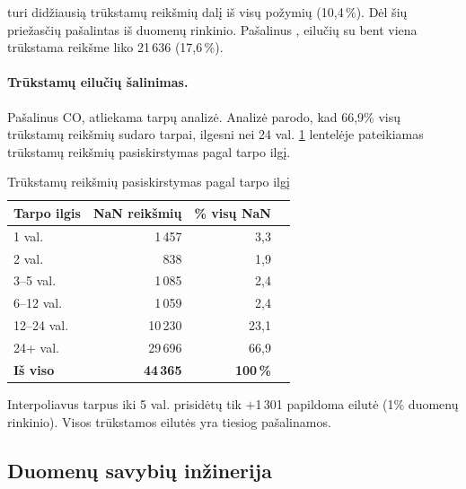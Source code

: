 \documentclass[]{VUMIFTemplateClass}
\begin{document}
     turi didžiausią trūkstamų reikšmių dalį iš visų požymių (10,4\,\%). Dėl šių priežasčių  pašalintas iš duomenų rinkinio.
    Pašalinus , eilučių su bent viena trūkstama reikšme liko 21\,636 (17,6\,\%).

    \paragraph{Trūkstamų eilučių šalinimas.}
    Pašalinus CO, atliekama tarpų analizė.
    Analizė parodo, kad 66,9\% visų trūkstamų reikšmių sudaro tarpai, ilgesni nei 24 val. \ref{tab:gap_distribution} lentelėje pateikiamas trūkstamų reikšmių pasiskirstymas pagal tarpo ilgį.

    \begin{table}[H]
        \centering
        \caption{Trūkstamų reikšmių pasiskirstymas pagal tarpo ilgį}
        \small
        \setlength{\tabcolsep}{5pt}
        \begin{tabular}{|l|r|r|r|}
            \hline
            \textbf{Tarpo ilgis} & \textbf{NaN reikšmių} & \textbf{\% visų NaN} \\
            \hline
            1 val.               & 1\,457                & 3,3                  \\
            2 val.               & 838                   & 1,9                  \\
            3--5 val.            & 1\,085                & 2,4                  \\
            6--12 val.           & 1\,059                & 2,4                  \\
            12--24 val.          & 10\,230               & 23,1                 \\
            24+ val.             & 29\,696               & 66,9                 \\
            \hline
            \textbf{Iš viso}     & \textbf{44\,365}      & \textbf{100\,\%}     \\
            \hline
        \end{tabular}
        \label{tab:gap_distribution}
    \end{table}

    Interpoliavus tarpus iki 5 val. prisidėtų tik $+$1\,301 papildoma eilutė (1\% duomenų rinkinio).
    Visos trūkstamos eilutės yra tiesiog pašalinamos.

    \subsection{Duomenų savybių inžinerija}
\end{document}
